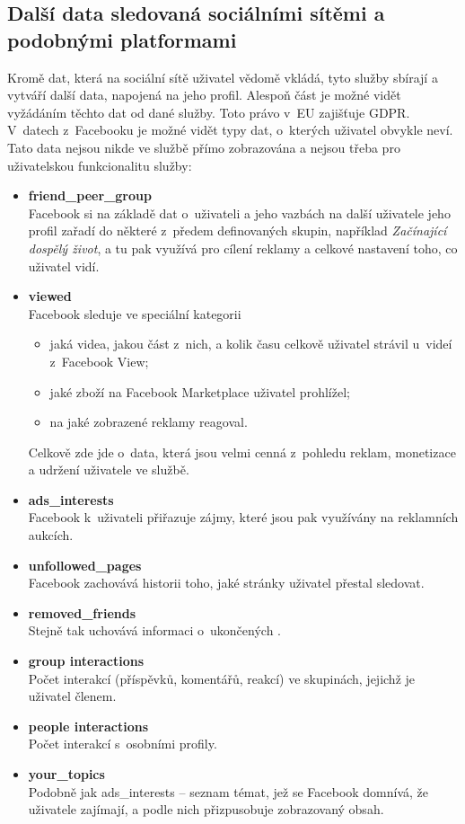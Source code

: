 \subsection{Další data sledovaná sociálními sítěmi a podobnými platformami}
Kromě dat, která na sociální sítě uživatel vědomě vkládá, tyto služby sbírají a vytváří další data, napojená na jeho profil. Alespoň část je možné vidět vyžádáním těchto dat od dané služby. Toto právo v~EU zajišťuje GDPR.\\
V~datech z~Facebooku je možné vidět typy dat, o~kterých uživatel obvykle neví. Tato data nejsou nikde ve službě přímo zobrazována a nejsou třeba pro uživatelskou funkcionalitu služby:
\begin{itemize}
	\item \textbf{friend\_peer\_group}\\
	Facebook si na základě dat o~uživateli a jeho vazbách na další uživatele jeho profil zařadí do některé z~předem definovaných skupin, například \textit{Začínající dospělý život}, a tu pak využívá pro cílení reklamy a celkové nastavení toho, co uživatel vidí.
	
	\item \textbf{viewed}\\
	Facebook sleduje ve speciální kategorii
	\begin{itemize}
		\item jaká videa, jakou část z~nich, a kolik času celkově uživatel strávil u~videí z~Facebook View;
		\item jaké zboží na Facebook Marketplace uživatel prohlížel;
		\item na jaké zobrazené reklamy reagoval.
	\end{itemize}
	Celkově zde jde o~data, která jsou velmi cenná z~pohledu reklam, monetizace a udržení uživatele ve službě.
	
	\item \textbf{ads\_interests}\\
	Facebook k~uživateli přiřazuje zájmy, které jsou pak využívány na reklamních aukcích.

	\item \textbf{unfollowed\_pages}\\
	Facebook zachovává historii toho, jaké stránky uživatel přestal sledovat.

	\item \textbf{removed\_friends}\\
	Stejně tak uchovává informaci o~ukončených .

	\item \textbf{group interactions}\\
	Počet interakcí (příspěvků, komentářů, reakcí) ve skupinách, jejichž je uživatel členem.

	\item \textbf{people interactions}\\
	Počet interakcí s~osobními profily.

	\item \textbf{your\_topics}\\
	Podobně jak ads\_interests -- seznam témat, jež se Facebook domnívá, že uživatele zajímají, a podle nich přizpusobuje zobrazovaný obsah.
\end{itemize}

